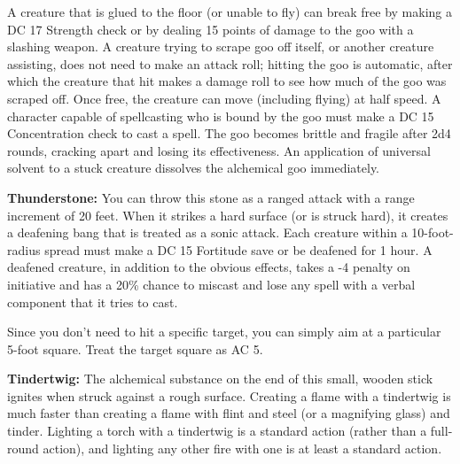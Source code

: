 A creature that is glued to the floor (or unable to fly) can break free by making a DC 17 Strength check or by dealing 15 points of damage to the goo with a slashing weapon. A creature trying to scrape goo off itself, or another creature assisting, does not need to make an attack roll; hitting the goo is automatic, after which the creature that hit makes a damage roll to see how much of the goo was scraped off. Once free, the creature can move (including flying) at half speed. A character capable of spellcasting who is bound by the goo must make a DC 15 Concentration check to cast a spell. The goo becomes brittle and fragile after 2d4 rounds, cracking apart and losing its effectiveness. An application of universal solvent to a stuck creature dissolves the alchemical goo immediately.

\textbf{Thunderstone:} You can throw this stone as a ranged attack with a range increment of 20 feet. When it strikes a hard surface (or is struck hard), it creates a deafening bang that is treated as a sonic attack. Each creature within a 10-foot-radius spread must make a DC 15 Fortitude save or be deafened for 1 hour. A deafened creature, in addition to the obvious effects, takes a -4 penalty on initiative and has a 20\% chance to miscast and lose any spell with a verbal component that it tries to cast.

Since you don't need to hit a specific target, you can simply aim at a particular 5-foot square. Treat the target square as AC 5.

\textbf{Tindertwig:} The alchemical substance on the end of this small, wooden stick ignites when struck against a rough surface. Creating a flame with a tindertwig is much faster than creating a flame with flint and steel (or a magnifying glass) and tinder. Lighting a torch with a tindertwig is a standard action (rather than a full-round action), and lighting any other fire with one is at least a standard action.